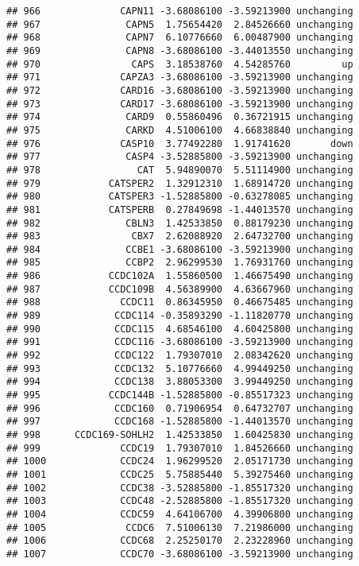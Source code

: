 \documentclass[]{article}
\begin{document}
\begin{verbatim}
## 966              CAPN11 -3.68086100 -3.59213900 unchanging
## 967               CAPN5  1.75654420  2.84526660 unchanging
## 968               CAPN7  6.10776660  6.00487900 unchanging
## 969               CAPN8 -3.68086100 -3.44013550 unchanging
## 970                CAPS  3.18538760  4.54285760         up
## 971              CAPZA3 -3.68086100 -3.59213900 unchanging
## 972              CARD16 -3.68086100 -3.59213900 unchanging
## 973              CARD17 -3.68086100 -3.59213900 unchanging
## 974               CARD9  0.55860496  0.36721915 unchanging
## 975               CARKD  4.51006100  4.66838840 unchanging
## 976              CASP10  3.77492280  1.91741620       down
## 977               CASP4 -3.52885800 -3.59213900 unchanging
## 978                 CAT  5.94890070  5.51114900 unchanging
## 979            CATSPER2  1.32912310  1.68914720 unchanging
## 980            CATSPER3 -1.52885800 -0.63278085 unchanging
## 981            CATSPERB  0.27849698 -1.44013570 unchanging
## 982               CBLN3  1.42533850  0.88179230 unchanging
## 983                CBX7  2.62088920  2.64732700 unchanging
## 984               CCBE1 -3.68086100 -3.59213900 unchanging
## 985               CCBP2  2.96299530  1.76931760 unchanging
## 986            CCDC102A  1.55860500  1.46675490 unchanging
## 987            CCDC109B  4.56389900  4.63667960 unchanging
## 988              CCDC11  0.86345950  0.46675485 unchanging
## 989             CCDC114 -0.35893290 -1.11820770 unchanging
## 990             CCDC115  4.68546100  4.60425800 unchanging
## 991             CCDC116 -3.68086100 -3.59213900 unchanging
## 992             CCDC122  1.79307010  2.08342620 unchanging
## 993             CCDC132  5.10776660  4.99449250 unchanging
## 994             CCDC138  3.88053300  3.99449250 unchanging
## 995            CCDC144B -1.52885800 -0.85517323 unchanging
## 996             CCDC160  0.71906954  0.64732707 unchanging
## 997             CCDC168 -1.52885800 -1.44013570 unchanging
## 998      CCDC169-SOHLH2  1.42533850  1.60425830 unchanging
## 999              CCDC19  1.79307010  1.84526660 unchanging
## 1000             CCDC24  1.96299520  2.05171730 unchanging
## 1001             CCDC25  5.75885440  5.39275460 unchanging
## 1002             CCDC38 -3.52885800 -1.85517320 unchanging
## 1003             CCDC48 -2.52885800 -1.85517320 unchanging
## 1004             CCDC59  4.64106700  4.39906800 unchanging
## 1005              CCDC6  7.51006130  7.21986000 unchanging
## 1006             CCDC68  2.25250170  2.23228960 unchanging
## 1007             CCDC70 -3.68086100 -3.59213900 unchanging

\end{verbatim}
\end{document}
